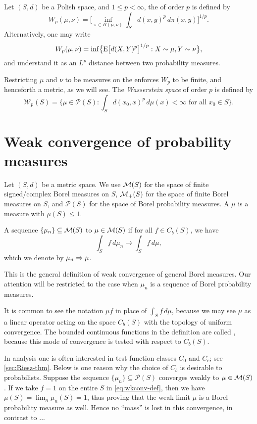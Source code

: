 Let $(S,d)$ be a Polish space, and $1\leq p < \infty$, the  of order $p$ is defined by \[
    W_p(\mu,\nu) = \biggl[\inf_{\pi \in \Pi(\mu,\nu)} \int_S d(x,y)^p \,d\pi(x,y)\biggr]^{1/p}.
\] Alternatively, one may write \[
    W_p(\mu,\nu) = \inf\bigl\{\mathop{}\!\mathrm{E} \bigl[d(X,Y)^p\bigr]^{1/p} : X \sim \mu, Y \sim \nu\bigr\}, 
\] and understand it as an $L^p$ distance between two probability measures.

Restricting $\mu$ and $\nu$ to be measures on the  enforces $W_p$ to be finite, and henceforth a metric, as we will see. The \emph{Wasserstein space} of order $p$ is defined by \[
    \mathcal W_p(S) = \biggl\{\mu \in \mathcal{P}(S): \int_S d(x_0,x)^p \,d\mu(x) < \infty \text{ for all }x_0\in S\biggr\}.
\]

\section{Weak convergence of probability measures}
Let $(S,d)$ be a metric space. We use $\mathcal{M}(S)$ for the space of finite signed/complex Borel measures on $S$, $\mathcal{M}_+(S)$ for the space of finite Borel measures on $S$, and $\mathcal P(S)$ for the space of Borel probability measures. A  $\mu$ is a measure with $\mu(S) \leq 1$.
\begin{defn}
    A sequence $\{\mu_n\} \subseteq \mathcal{M}(S)$  to $\mu\in \mathcal{M}(S)$ if for all $f\in C_b(S)$, we have \begin{equation}
        \int_S f\,d\mu_n \to \int_S f\,d\mu, \label{eq:wkconv-def}
    \end{equation}
    which we denote by $\mu_n \Rightarrow \mu$.
\end{defn}

This is the general definition of weak convergence of general Borel measures. Our attention will be restricted to the case when ${\mu_n}$ is a sequence of Borel probability measures.

It is common to see the notation $\mu f$ in place of $\int_S f\,d\mu$, because we may see $\mu$ as a linear operator acting on the space $C_b(S)$ with the topology of uniform convergence. The bounded continuous functions in the definition are called , because this mode of convergence is tested with respect to $C_b(S)$.

In analysis one is often interested in test function classes $C_0$ and $C_c$; see \cref{sec:Riesz-thm}. Below is one reason why the choice of $C_b$ is desirable to probabilists. Suppose the sequence $\{\mu_n\} \subseteq \mathcal{P}(S)$ converges weakly to $\mu\in \mathcal{M}(S)$. If we take $f = 1$ on the entire $S$ in \eqref{eq:wkconv-def}, then we have $\mu(S) = \lim_n \mu_n(S) = 1$, thus proving that the weak limit $\mu$ is a Borel probability measure as well. Hence no ``mass'' is lost in this convergence, in contrast to ...


